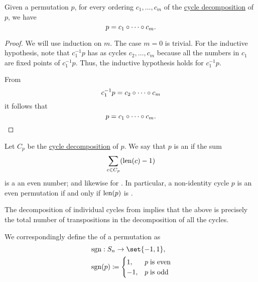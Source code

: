 \begin{proposition}\label{thm:permutation_decomposition}
  Given a permutation \( p \), for every ordering \( c_1, \ldots, c_m \) of the \hyperref[def:permutation_cycle_decomposition]{cycle decomposition} of \( p \), we have
  \begin{equation*}
    p = c_1 \bincirc \cdots \bincirc c_m.
  \end{equation*}
\end{proposition}
\begin{proof}
  We will use induction on \( m \). The case \( m = 0 \) is trivial. For the inductive hypothesis, note that \( c_1^{-1} p \) has as cycles \( c_2, \ldots, c_m \) because all the numbers in \( c_1 \) are fixed points of \( c_1^{-1} p \). Thus, the inductive hypothesis holds for \( c_1^{-1} p \).

  From
  \begin{equation*}
    c_1^{-1} p = c_2 \bincirc \cdots \bincirc c_m
  \end{equation*}
  it follows that
  \begin{equation*}
    p = c_1 \bincirc \cdots \bincirc c_m.
  \end{equation*}
\end{proof}

\begin{definition}\label{def:permutation_parity}
  Let \( C_p \) be the \hyperref[def:permutation_cycle_decomposition]{cycle decomposition} of \( p \). We say that \( p \) is an  if the sum
  \begin{equation*}
    \sum_{c \in C_p} (\operatorname{len}(c) - 1)
  \end{equation*}
  is a an even number; and likewise for . In particular, a non-identity cycle \( p \) is an even permutation if and only if \( \operatorname{len}(p) \) is .

  The decomposition of individual cycles from  implies that the above is precisely the total number of transpositions in the decomposition of all the cycles.

  We correspondingly define the  of a permutation as
  \begin{equation*}
    \begin{aligned}
       &\sgn: S_n \to \set{ -1, 1 }, \\
       &\sgn(p) \coloneqq \begin{cases}
        1,  &p \T{is even} \\
        -1, &p \T{is odd}
      \end{cases}
    \end{aligned}
  \end{equation*}
\end{definition}

